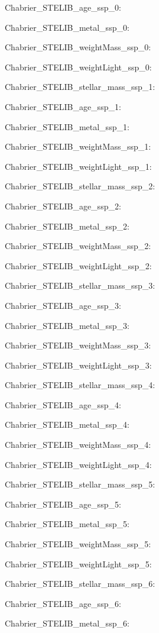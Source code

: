 \item Chabrier\_STELIB\_age\_ssp\_0: 
\item Chabrier\_STELIB\_metal\_ssp\_0: 
\item Chabrier\_STELIB\_weightMass\_ssp\_0: 
\item Chabrier\_STELIB\_weightLight\_ssp\_0: 
\item Chabrier\_STELIB\_stellar\_mass\_ssp\_1: 
\item Chabrier\_STELIB\_age\_ssp\_1: 
\item Chabrier\_STELIB\_metal\_ssp\_1: 
\item Chabrier\_STELIB\_weightMass\_ssp\_1: 
\item Chabrier\_STELIB\_weightLight\_ssp\_1: 
\item Chabrier\_STELIB\_stellar\_mass\_ssp\_2: 
\item Chabrier\_STELIB\_age\_ssp\_2: 
\item Chabrier\_STELIB\_metal\_ssp\_2: 
\item Chabrier\_STELIB\_weightMass\_ssp\_2: 
\item Chabrier\_STELIB\_weightLight\_ssp\_2: 
\item Chabrier\_STELIB\_stellar\_mass\_ssp\_3: 
\item Chabrier\_STELIB\_age\_ssp\_3: 
\item Chabrier\_STELIB\_metal\_ssp\_3: 
\item Chabrier\_STELIB\_weightMass\_ssp\_3: 
\item Chabrier\_STELIB\_weightLight\_ssp\_3: 
\item Chabrier\_STELIB\_stellar\_mass\_ssp\_4: 
\item Chabrier\_STELIB\_age\_ssp\_4: 
\item Chabrier\_STELIB\_metal\_ssp\_4: 
\item Chabrier\_STELIB\_weightMass\_ssp\_4: 
\item Chabrier\_STELIB\_weightLight\_ssp\_4: 
\item Chabrier\_STELIB\_stellar\_mass\_ssp\_5: 
\item Chabrier\_STELIB\_age\_ssp\_5: 
\item Chabrier\_STELIB\_metal\_ssp\_5: 
\item Chabrier\_STELIB\_weightMass\_ssp\_5: 
\item Chabrier\_STELIB\_weightLight\_ssp\_5: 
\item Chabrier\_STELIB\_stellar\_mass\_ssp\_6: 
\item Chabrier\_STELIB\_age\_ssp\_6: 
\item Chabrier\_STELIB\_metal\_ssp\_6: 
